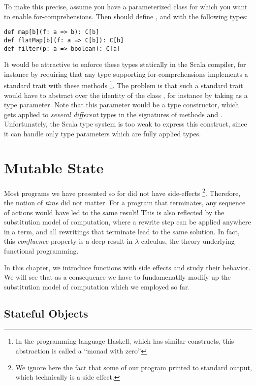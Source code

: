 \documentclass[a4paper,12pt,twoside,titlepage]{book}
\begin{document}
{To make this precise, assume you have a parameterized class
  for which you want to enable for-comprehensions. Then
  should define ,  and 
 with the following types:
\begin{lstlisting}
def map[b](f: a => b): C[b]
def flatMap[b](f: a => C[b]): C[b]
def filter(p: a => boolean): C[a]
\end{lstlisting}
It would be attractive to enforce these types statically in the Scala
compiler, for instance by requiring that any type supporting
for-comprehensions implements a standard trait with these methods
\footnote{In the programming language Haskell, which has similar
constructs, this abstraction is called a ``monad with zero''}.  The
problem is that such a standard trait would have to abstract over the
identity of the class , for instance by taking  as a
type parameter.  Note that this parameter would be a type constructor,
which gets applied to {\em several different} types in the signatures of
methods  and . Unfortunately, the Scala type
system is too weak to express this construct, since it can handle only
type parameters which are fully applied types.

\chapter{Mutable State}

Most programs we have presented so for did not have side-effects
\footnote{We ignore here the fact that some of our program printed to
standard output, which technically is a side effect.}.  Therefore, the
notion of {\em time} did not matter.  For a program that terminates,
any sequence of actions would have led to the same result!  This is
also reflected by the substitution model of computation, where a
rewrite step can be applied anywhere in a term, and all rewritings
that terminate lead to the same solution.  In fact, this {\em
confluence} property is a deep result in $\lambda$-calculus, the
theory underlying functional programming. 

In this chapter, we introduce functions with side effects and study
their behavior. We will see that as a consequence we have to
fundamenatlly modify up the substitution model of computation which we
employed so far.

\section{Stateful Objects}

}
\end{document}
